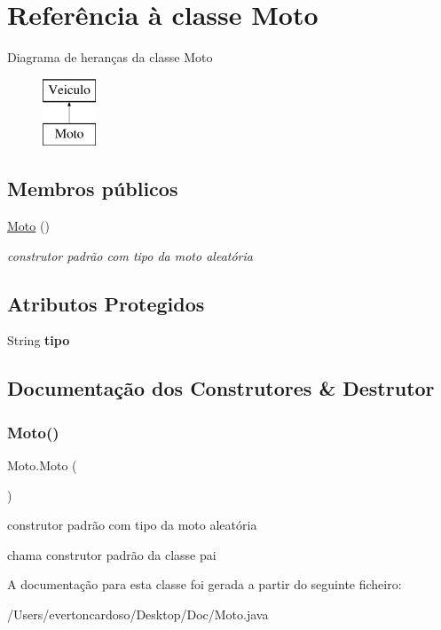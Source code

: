 \hypertarget{class_moto}{}\section{Referência à classe Moto}
\label{class_moto}
Diagrama de heranças da classe Moto\begin{figure}[H]
\begin{center}
\leavevmode
\includegraphics[height=2.000000cm]{class_moto}
\end{center}
\end{figure}
\subsection*{Membros públicos}
\begin{DoxyCompactItemize}
\item 
\mbox{\hyperlink{class_moto_af900d6c1d6b9a69fb6b8bdb0c3401603}{Moto}} ()
\begin{DoxyCompactList}\small\item\em construtor padrão com tipo da moto aleatória \end{DoxyCompactList}\end{DoxyCompactItemize}
\subsection*{Atributos Protegidos}
\begin{DoxyCompactItemize}
\item 
\mbox{\label{class_moto_a98533b801c6277bdac415e9d21f74efe}} 
String {\bfseries tipo}
\end{DoxyCompactItemize}


\subsection{Documentação dos Construtores \& Destrutor}
\mbox{\label{class_moto_af900d6c1d6b9a69fb6b8bdb0c3401603}} 
\subsubsection{\texorpdfstring{Moto()}{Moto()}}
{\footnotesize\ttfamily Moto.\+Moto (\begin{DoxyParamCaption}{ }\end{DoxyParamCaption})}



construtor padrão com tipo da moto aleatória 

chama construtor padrão da classe pai 

A documentação para esta classe foi gerada a partir do seguinte ficheiro\+:\begin{DoxyCompactItemize}
\item 
/\+Users/evertoncardoso/\+Desktop/\+Doc/Moto.\+java\end{DoxyCompactItemize}
